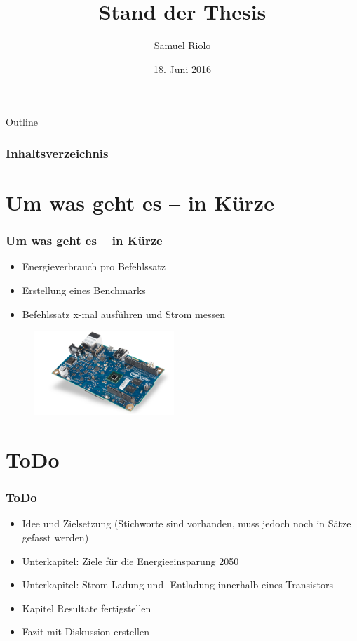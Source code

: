 \documentclass{beamer}
\title[Energie in der Informatik]{Stand der Thesis}
\author{Samuel Riolo}
\institute{FFHS}
\date{18. Juni 2016}
\begin{document}
\begin{frame}
  \titlepage
\end{frame}

\begin{frame}{Outline}
\frametitle{Inhaltsverzeichnis}
    \tableofcontents[]
\end{frame}



\section{Um was geht es -- in K{\"u}rze} 
\begin{frame}
\frametitle{Um was geht es -- in K{\"u}rze} 
\begin{itemize}
\item Energieverbrauch pro Befehlssatz
\item Erstellung eines Benchmarks
\item Befehlssatz x-mal ausführen und Strom messen
\end{itemize}


\begin{figure}
  \includegraphics[width=200px,height=120px]{iot_galileo.png}
\end{figure}	

\end{frame}


\section{ToDo} 
\begin{frame}
\frametitle{ToDo}
\begin{itemize}
\item Idee und Zielsetzung (Stichworte sind vorhanden, muss jedoch noch in Sätze gefasst werden)
\item Unterkapitel: Ziele für die Energieeinsparung 2050
\item Unterkapitel: Strom-Ladung und -Entladung innerhalb eines Transistors
\item Kapitel Resultate fertigstellen
\item Fazit mit Diskussion erstellen
\end{itemize}

\end{frame}
\end{document}
